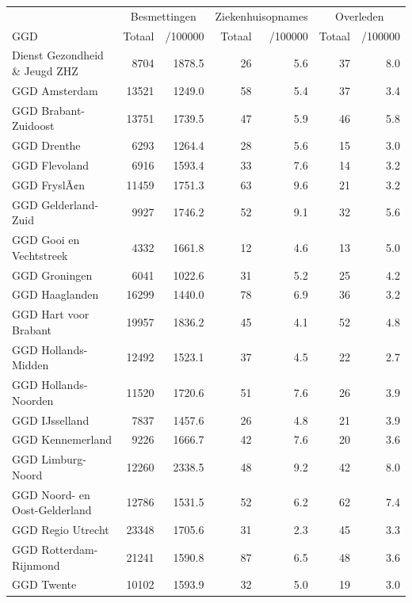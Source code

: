 \documentclass[
  english,
  man,floatsintext]{apa6}
\begin{document}
\begin{table}
\centering\begingroup\fontsize{10}{12}\selectfont

\begin{threeparttable}
\begin{tabular}{lrrrrrr}
\toprule
\multicolumn{1}{c}{ } & \multicolumn{2}{c}{Besmettingen} & \multicolumn{2}{c}{Ziekenhuisopnames} & \multicolumn{2}{c}{Overleden} \\
\cmidrule(l{3pt}r{3pt}){2-3} \cmidrule(l{3pt}r{3pt}){4-5} \cmidrule(l{3pt}r{3pt}){6-7}
GGD & Totaal & /100000 & Totaal & /100000 & Totaal & /100000\\
\midrule
Dienst Gezondheid \& Jeugd ZHZ & 8704 & 1878.5 & 26 & 5.6 & 37 & 8.0\\
GGD Amsterdam & 13521 & 1249.0 & 58 & 5.4 & 37 & 3.4\\
GGD Brabant-Zuidoost & 13751 & 1739.5 & 47 & 5.9 & 46 & 5.8\\
GGD Drenthe & 6293 & 1264.4 & 28 & 5.6 & 15 & 3.0\\
GGD Flevoland & 6916 & 1593.4 & 33 & 7.6 & 14 & 3.2\\
GGD FryslÃ¢n & 11459 & 1751.3 & 63 & 9.6 & 21 & 3.2\\
GGD Gelderland-Zuid & 9927 & 1746.2 & 52 & 9.1 & 32 & 5.6\\
GGD Gooi en Vechtstreek & 4332 & 1661.8 & 12 & 4.6 & 13 & 5.0\\
GGD Groningen & 6041 & 1022.6 & 31 & 5.2 & 25 & 4.2\\
GGD Haaglanden & 16299 & 1440.0 & 78 & 6.9 & 36 & 3.2\\
GGD Hart voor Brabant & 19957 & 1836.2 & 45 & 4.1 & 52 & 4.8\\
GGD Hollands-Midden & 12492 & 1523.1 & 37 & 4.5 & 22 & 2.7\\
GGD Hollands-Noorden & 11520 & 1720.6 & 51 & 7.6 & 26 & 3.9\\
GGD IJsselland & 7837 & 1457.6 & 26 & 4.8 & 21 & 3.9\\
GGD Kennemerland & 9226 & 1666.7 & 42 & 7.6 & 20 & 3.6\\
GGD Limburg-Noord & 12260 & 2338.5 & 48 & 9.2 & 42 & 8.0\\
GGD Noord- en Oost-Gelderland & 12786 & 1531.5 & 52 & 6.2 & 62 & 7.4\\
GGD Regio Utrecht & 23348 & 1705.6 & 31 & 2.3 & 45 & 3.3\\
GGD Rotterdam-Rijnmond & 21241 & 1590.8 & 87 & 6.5 & 48 & 3.6\\
GGD Twente & 10102 & 1593.9 & 32 & 5.0 & 19 & 3.0\\

\end{tabular}
\end{threeparttable}
\end{table}
\end{document}
